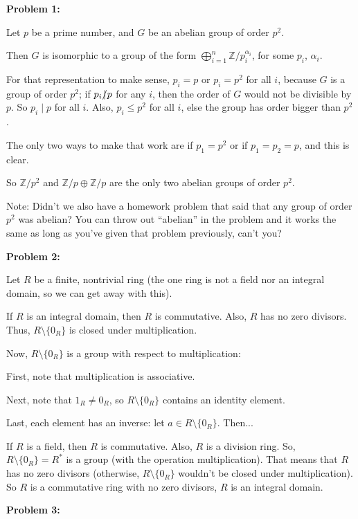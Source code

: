 \documentclass[a4paper,12pt]{article}
\newcommand{\tab}{\hspace{4mm}} %
\newcommand{\shunt}{\vspace{20mm}}
\newcommand{\al}{\alpha} %
\newcommand{\Z}{\mathbb{Z}}
\begin{document}
{\bf Problem 1:}

Let $p$ be a prime number, and $G$ be an abelian group of order $p^2$.

Then $G$ is isomorphic to a group of the form $\bigoplus\limits_{i=1}^n \Z/p_i^{\al_i}$, for some $p_i$, $\al_i$.

For that representation to make sense, $p_i=p$ or $p_i=p^2$ for all $i$, because $G$ is a group of order $p^2$; if $p_i \slashed{\mid} p$ for any $i$, then the order of $G$ would not be divisible by $p$. So $p_i \mid p$ for all $i$. Also, $p_i \leq p^2$ for all $i$, else the group has order bigger than $p^2$.

The only two ways to make that work are if $p_1 = p^2$ or if $p_1=p_2=p$, and this is clear.

So $\Z/p^2$ and $\Z/p \oplus \Z/p$ are the only two abelian groups of order $p^2$.

Note: Didn't we also have a homework problem that said that any group of order $p^2$ was abelian? You can throw out ``abelian'' in the problem and it works the same as long as you've given that problem previously, can't you?

\shunt

{\bf Problem 2:} %

Let $R$ be a finite, nontrivial ring (the one ring is not a field nor an integral domain, so we can get away with this). 

If $R$ is an integral domain, then $R$ is commutative. Also, $R$ has no zero divisors. Thus, $R \setminus \{0_R\}$ is closed under multiplication.

Now, $R \setminus \{0_R\}$ is a group with respect to multiplication:

\tab First, note that multiplication is associative.

\tab Next, note that $1_R \neq 0_R$, so $R \setminus \{0_R\}$ contains an identity element.

\tab Last, each element has an inverse: let $a \in R \setminus \{0_R\}$. Then...%

If $R$ is a field, then $R$ is commutative. Also, $R$ is a division ring. So, $R \setminus \{0_R\} = R^*$ is a group (with the operation multiplication). That means that $R$ has no zero divisors (otherwise, $R \setminus \{0_R\}$ wouldn't be closed under multiplication). So $R$ is a commutative ring with no zero divisors, $R$ is an integral domain.

\shunt

{\bf Problem 3:} %
\end{document}
